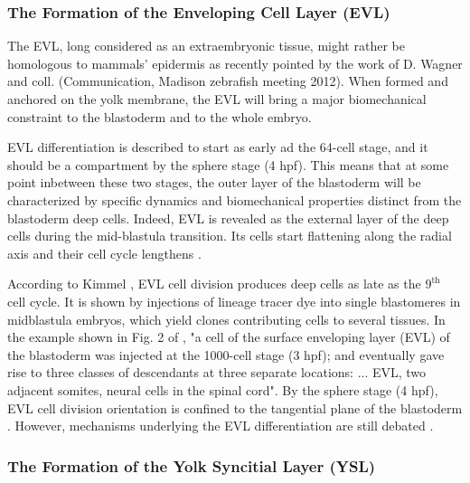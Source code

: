 \subsubsection{The Formation of the Enveloping Cell Layer (EVL)}


The EVL, long considered as an extraembryonic tissue, might rather be homologous to mammals' epidermis as recently pointed by the work of D. Wagner and coll. (Communication, Madison zebrafish meeting 2012). When formed and anchored on the yolk membrane, the EVL will bring a major biomechanical constraint to the blastoderm and to the whole embryo.

EVL differentiation is described to start as early ad the 64-cell stage, and it should be a compartment by the sphere stage (4 hpf). This means that at some point inbetween these two stages, the outer layer of the blastoderm will be characterized by specific dynamics and biomechanical properties distinct from the blastoderm deep cells. Indeed, EVL is revealed as the external layer of the deep cells during the mid-blastula transition. Its cells start flattening along the radial axis and their cell cycle lengthens \cite{Kane:1992gw}.

According to Kimmel \cite{Kimmel:1985vc}, EVL cell division produces deep cells as late as the $9^{\mathrm{th}}$ cell cycle. It is shown by injections of lineage tracer dye into single blastomeres in midblastula embryos, which yield clones contributing cells to several tissues. In the example shown in Fig. 2 of \cite{Kimmel:1985vc}, "a cell of the surface enveloping layer (EVL) of the blastoderm was injected at the 1000-cell stage (3 hpf); and eventually gave rise to three classes of descendants at three separate locations: ... EVL, two adjacent somites, neural cells in the spinal cord". By the sphere stage (4 hpf), EVL cell division orientation is confined to the tangential plane of the blastoderm \cite{Kimmel:1990us}. However, mechanisms underlying the EVL differentiation are still debated \cite{Manning:2010ce}\cite{Krens:2011ht}. 



\subsubsection{The Formation of the Yolk Syncitial Layer (YSL)}


